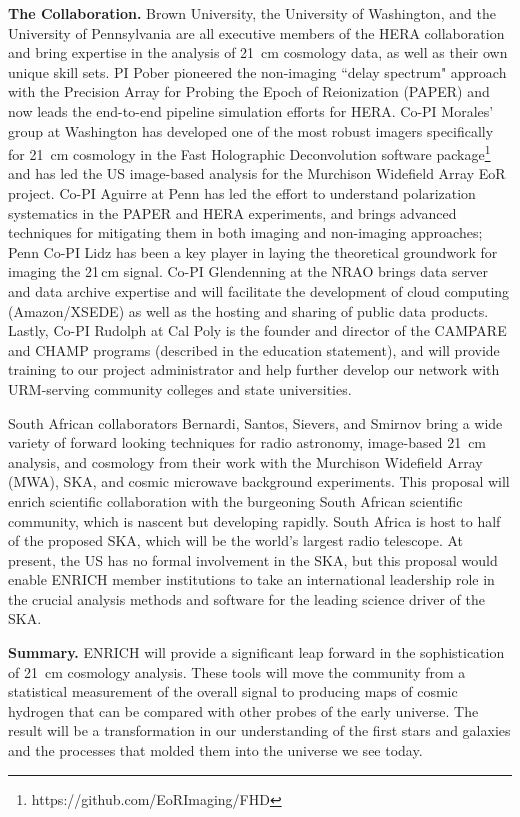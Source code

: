 \documentclass[preprint,11pt]{aastex}
\begin{document}
\vspace{8pt}
\textbf{The Collaboration.} Brown University, the University of Washington, and the University of Pennsylvania are all executive members of the HERA collaboration and bring expertise in the analysis of 21\, cm cosmology data, as well as their own unique skill sets.  PI Pober pioneered the non-imaging ``delay spectrum" approach with the Precision Array for Probing the Epoch of Reionization (PAPER) and now leads the end-to-end pipeline simulation efforts for HERA.  Co-PI Morales' group at Washington has developed one of the most robust imagers specifically for 21\, cm cosmology in the Fast Holographic Deconvolution software package\footnote{https://github.com/EoRImaging/FHD} and has led the US image-based analysis for the Murchison Widefield Array EoR project.  Co-PI Aguirre at Penn has led the effort to understand polarization systematics in the PAPER and HERA experiments, and brings advanced techniques for mitigating them in both imaging and non-imaging approaches; Penn Co-PI Lidz has been a key player in laying the theoretical groundwork for imaging the 21\,cm signal.  Co-PI Glendenning at the NRAO brings data server and data archive expertise and will facilitate the development of cloud computing (Amazon/XSEDE) as well as the hosting and sharing of public data products.  Lastly, Co-PI Rudolph at Cal Poly is the founder and director of the CAMPARE and CHAMP programs (described in the education statement), and will provide training to our project administrator and help further develop our network with URM-serving community colleges and state universities.

South African collaborators Bernardi, Santos, Sievers, and Smirnov bring a wide variety of forward looking techniques for radio astronomy, image-based 21\, cm analysis, and cosmology from their work with the Murchison Widefield Array (MWA), SKA, and cosmic microwave background experiments.  This proposal will enrich scientific collaboration with the burgeoning South African scientific community, which is nascent but developing rapidly.  South Africa is host to half of the proposed SKA, which will be the world's largest radio telescope. At present, the US has no formal involvement in the SKA, but this proposal would enable ENRICH member institutions to take an international leadership role in the crucial analysis methods and software for the leading science driver of the SKA.

\vspace{8pt}
\textbf{Summary.} ENRICH will provide a significant leap forward in the sophistication of 21\, cm cosmology analysis.  These tools will move the community from a statistical measurement of the overall signal to producing maps of cosmic hydrogen that can be compared with other probes of the early universe.  The result will be a transformation in our understanding of the first stars and galaxies and the processes that molded them into the universe we see today.
\end{document}

